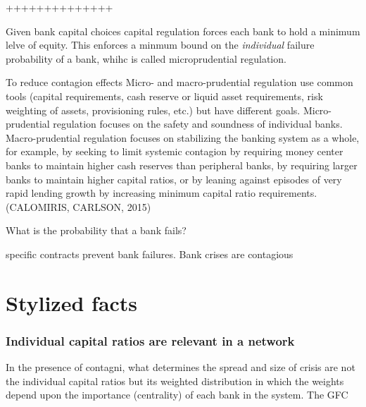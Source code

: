 \documentclass[11pt,final]{article}%
\begin{document}
++++++++++++++

Given bank capital choices capital regulation forces each bank to hold a minimum lelve of equity. This enforces a minmum bound on the \textit{individual} failure probability of a bank, whihc is called microprudential regulation.

To reduce contagion effects Micro- and macro-prudential regulation use common tools (capital requirements, cash reserve or liquid asset requirements, risk weighting of assets, provisioning rules, etc.) but have different goals. Micro-prudential regulation focuses on the safety and soundness of individual banks. Macro-prudential regulation focuses on stabilizing the banking system as a whole, for example, by seeking to limit systemic contagion by requiring money center banks to maintain higher cash reserves than peripheral banks, by requiring larger banks to maintain higher capital ratios, or by leaning against episodes of very rapid lending growth by increasing minimum capital ratio requirements. (CALOMIRIS, CARLSON, 2015)


What is the probability that a bank fails?

 
 
 specific contracts prevent bank failures. 
Bank crises are contagious



\section{Stylized facts}

\subsubsection{Individual capital ratios are relevant in a network}
In the presence of contagni, what determines the spread and size of crisis are not the individual capital ratios but its weighted  distribution in which the weights depend upon the importance (centrality) of each bank in the system. The GFC  
\end{document}
